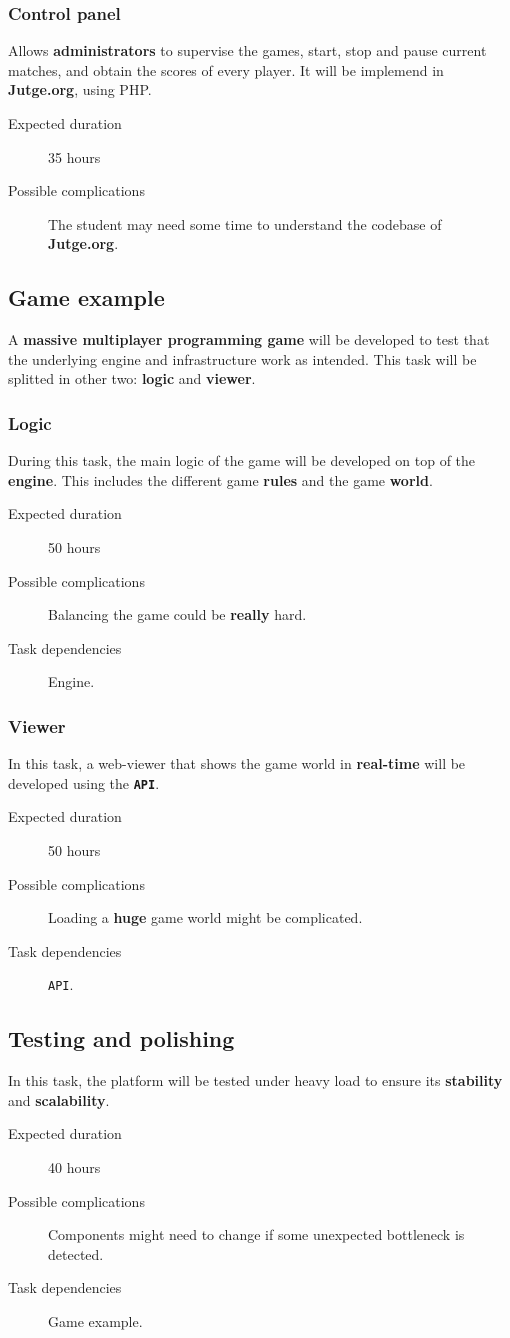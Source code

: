 \documentclass[a4paper,11pt,titlepage,abstract,numbers=noenddot,automark,mnsy,intlimits,rgb,dvipsnames]{report}
\begin{document}
\subsubsection{Control panel}
Allows \textbf{administrators} to supervise the games, start, stop and pause current matches, and obtain the
scores of every player. It will be implemend in \textbf{Jutge.org}, using \texttt{}PHP\texttt{}.
\begin{description}
\item[Expected duration]
35 hours
\item[Possible complications]
The student may need some time to understand the codebase of \textbf{Jutge.org}.
\end{description}
\subsection{Game example}
A \textbf{massive multiplayer programming game} will be developed to test that the underlying
engine and infrastructure work as intended. This task will be splitted in other two: \textbf{logic} and \textbf{viewer}.
\subsubsection{Logic}
During this task, the main logic of the game will be developed on top of the \textbf{engine}.
This includes the different game \textbf{rules} and the game \textbf{world}.
\begin{description}
\item[Expected duration]
50 hours
\item[Possible complications]
Balancing the game could be \textbf{really} hard.
\item[Task dependencies]
Engine.
\end{description}
\subsubsection{Viewer}
In this task, a web-viewer that shows the game world in \textbf{real-time} will be developed using the \textbf{\texttt{API}}.
\begin{description}
\item[Expected duration]
50 hours
\item[Possible complications]
Loading a \textbf{huge} game world might be complicated.
\item[Task dependencies]
\texttt{API}.
\end{description}
\subsection{Testing and polishing}
In this task, the platform will be tested under heavy load to ensure its \textbf{stability} and \textbf{scalability}.
\begin{description}
\item[Expected duration]
40 hours
\item[Possible complications]
Components might need to change if some unexpected bottleneck is detected.
\item[Task dependencies]
Game example.
\end{description}
\end{document}
